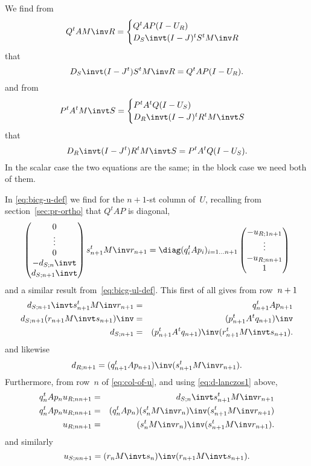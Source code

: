 \documentclass[11pt]{artikel3}
\begin{document}
\begin{Outline}
We find from
\[ Q^tAM\inv R= \begin{cases}Q^tAP(I-U_R)\cr D_S\invt(I-J)^tS^tM\inv R\end{cases} \]
that \begin{equation}
 D_S\invt(I-J^t)S^tM\inv R=Q^tAP(I-U_R). \label{eq:bicg-u-def}\end{equation}
and from
\[ P^tA^tM\invt S= \begin{cases}P^tA^tQ(I-U_S)\cr D_R\invt(I-J)^tR^tM\invt S\end{cases} \]
that \begin{equation}
 D_R\invt(I-J^t)R^tM\invt S=P^tA^tQ(I-U_S).
    \label{eq:bicg-ul-def}\end{equation}
In the scalar case the two equations are the same; in the block case
we need both of them.

In \eqref{eq:bicg-u-def} we find for the $n+1$-st column of~$U$,
recalling from section~\ref{sec:pr-ortho} that $Q^tAP$ is diagonal,
\begin{equation}
        \begin{pmatrix}0\cr \vdots \cr 0 \cr -d_{S;n}\invt\cr d_{S;n+1}\invt\end{pmatrix}
                s_{n+1}^tM\inv r_{n+1}
        =\diag(q_i^tAp_i)_{i=1\ldots n+1}
        \begin{pmatrix}-u_{R;1n+1}\cr \vdots \cr -u_{R;nn+1}\cr 1\end{pmatrix}
        \label{eq:col-of-u}\end{equation}
and a similar result from~\eqref{eq:bicg-ul-def}.
This first of all gives from row~$n+\nobreak1$
\begin{eqnarray}
    d_{S;n+1}\invt s_{n+1}^tM\inv r_{n+1}&=&q_{n+1}^tAp_{n+1}
        \label{eq:d-lanczos1}\\
    d_{S;n+1}(r_{n+1}M\invt s_{n+1})\inv&=&(p_{n+1}^tA^tq_{n+1})\inv\nonumber\\
    d_{S;n+1}&=&(p_{n+1}^tA^tq_{n+1})\inv (r_{n+1}^tM\invt s_{n+1}).
        \label{eq:dl-lanczos}\end{eqnarray}
and likewise
\begin{equation} d_{R;n+1}=(q_{n+1}^tAp_{n+1})\inv (s_{n+1}^tM\inv r_{n+1}).
    \label{eq:d-lanczos}\end{equation}
Furthermore, from row~$n$ of \eqref{eq:col-of-u},
and using \eqref{eq:d-lanczos1} above,
\begin{eqnarray}
    q_n^tAp_nu_{R;nn+1}&=&d_{S;n}\invt s_{n+1}^tM\inv r_{n+1}\nonumber\\
    q_n^tAp_nu_{R;nn+1}&=&(q_n^tAp_n)(s_n^tM\inv r_n)\inv(s_{n+1}^tM\inv r_{n+1})
                \nonumber\\
    u_{R;nn+1}&=&(s_n^tM\inv r_n)\inv (s_{n+1}^tM\inv r_{n+1}).
    \label{eq:u-lanczos}\end{eqnarray}
and similarly
\begin{equation} u_{S;nn+1}=(r_nM\invt s_n)\inv(r_{n+1}M\invt s_{n+1}).
    \label{eq:ul-lanczos}\end{equation}


\end{Outline}
\end{document}
